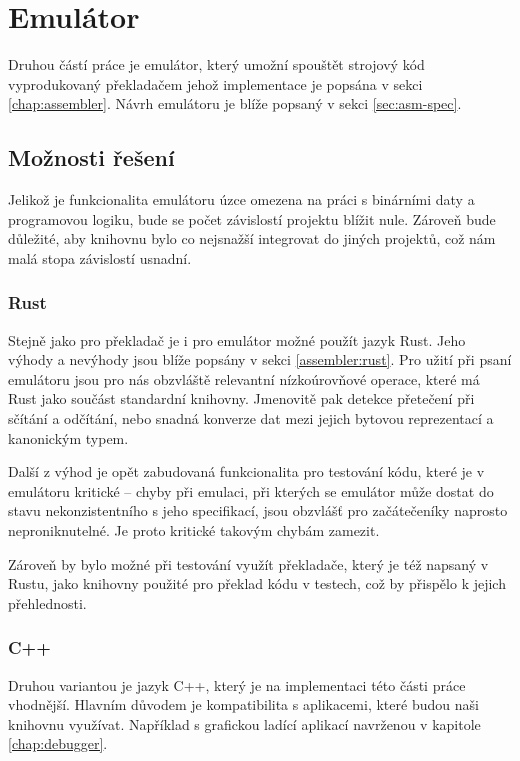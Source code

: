 \chapter{Emulátor}
\label{chap:emulator}

Druhou částí práce je emulátor, který umožní spouštět strojový kód vyprodukovaný překladačem jehož implementace je popsána v sekci \ref{chap:assembler}. Návrh emulátoru je blíže popsaný v sekci \ref{sec:asm-spec}.

\section{Možnosti řešení}

Jelikož je funkcionalita emulátoru úzce omezena na práci s binárními daty a programovou logiku, bude se počet závislostí projektu blížit nule. Zároveň bude důležité, aby knihovnu bylo co nejsnažší integrovat do jiných projektů, což nám malá stopa závislostí usnadní.

\subsection{Rust}

Stejně jako pro překladač je i pro emulátor možné použít jazyk Rust. Jeho výhody a nevýhody jsou blíže popsány v sekci \ref{assembler:rust}. Pro užití při psaní emulátoru jsou pro nás obzvláště relevantní nízkoúrovňové operace, které má Rust jako součást standardní knihovny. Jmenovitě pak detekce přetečení při sčítání a odčítání, nebo snadná konverze dat mezi jejich bytovou reprezentací a kanonickým typem.

Další z výhod je opět zabudovaná funkcionalita pro testování kódu, které je v emulátoru kritické -- chyby při emulaci, při kterých se emulátor může dostat do stavu nekonzistentního s jeho specifikací, jsou obzvlášť pro začátečeníky naprosto neproniknutelné. Je proto kritické takovým chybám zamezit.

Zároveň by bylo možné při testování využít překladače, který je též napsaný v Rustu, jako knihovny použité pro překlad kódu v testech, což by přispělo k jejich přehlednosti.

\subsection{C++}

Druhou variantou je jazyk C++, který je na implementaci této části práce vhodnější. Hlavním důvodem je kompatibilita s aplikacemi, které budou naši knihovnu využívat. Například s grafickou ladící aplikací navrženou v kapitole \ref{chap:debugger}.

